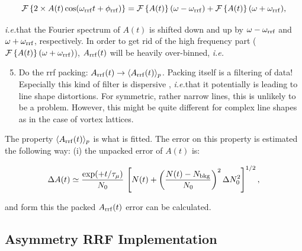 \documentclass[twoside]{article}
\newcommand{\ie}{\emph{i.e.\xspace}}
\begin{document}
\begin{equation}
 {\cal F}\left\{2 \times A(t) \cos(\omega_{\rm rrf} t + \phi_{\rm rrf}) \right\} = 
      {\cal F}\left\{A(t)\right\}(\omega-\omega_{\rm rrf}) + {\cal F}\left\{A(t)\right\}(\omega+\omega_{\rm rrf}),
\end{equation}

\noindent \ie that the Fourier spectrum of $A(t)$ is shifted down and up by $\omega - \omega_{\rm rrf}$ and $\omega + \omega_{\rm rrf}$, respectively.
In order to get rid of the high frequency part (${\cal F}\left\{A(t)\right\}(\omega+\omega_{\rm rrf})$), $A_{\rm rrf}(t)$ will be heavily over-binned,
\ie
 
\begin{enumerate}
 \setcounter{enumi}{4}
 \item Do the rrf packing: $A_{\rm rrf}(t) \rightarrow \langle A_{\rm rrf}(t) \rangle_p$. Packing itself is a filtering of data! Especially this
       kind of filter is dispersive \cite{King89}, \ie that it potentially is leading to line shape distortions. For symmetric, rather narrow
       lines, this is unlikely to be a problem. However, this might be quite different for complex line shapes as in the case of vortex lattices.
\end{enumerate}

\noindent The property $\langle A_{\rm rrf}(t) \rangle_p$ is what is fitted. The error on this property is estimated the following way: (i) the 
unpacked error of $A(t)$ is:

\begin{equation}
 \Delta A(t) \simeq \frac{\exp(+t/\tau_\mu)}{N_0}\,\left[ N(t) + \left( \frac{N(t)-N_{\rm bkg}}{N_0} \right)^2 \Delta N_0^2 \right]^{1/2},
\end{equation}

\noindent and form this the packed $A_{\rm rrf}(t)$ error can be calculated.

\subsection{Asymmetry RRF Implementation}
\end{document}
